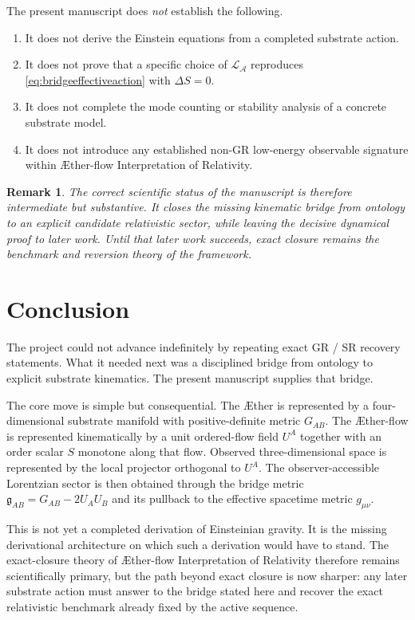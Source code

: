 \documentclass[11pt]{article}
\newcommand{\Aether}{\AE{}ther}
\newcommand{\Aflow}{\AE{}ther-flow}
\newcommand{\TheoryName}{\Aflow{} Interpretation of Relativity}
\newcommand{\Sub}{\mathcal{A}}
\newcommand{\BridgeMetric}{\mathfrak{g}}
\newtheorem{remark}{Remark}
\begin{document}
The present manuscript does \emph{not} establish the following.
\begin{enumerate}
    \item It does not derive the Einstein equations from a completed substrate action.
    \item It does not prove that a specific choice of \(\mathcal{L}_{\Sub}\) reproduces \eqref{eq:bridgeeffectiveaction} with \(\Delta S=0\).
    \item It does not complete the mode counting or stability analysis of a concrete substrate model.
    \item It does not introduce any established non-GR low-energy observable signature within \TheoryName{}.
\end{enumerate}

\begin{remark}
The correct scientific status of the manuscript is therefore intermediate but substantive. It closes the missing kinematic bridge from ontology to an explicit candidate relativistic sector, while leaving the decisive dynamical proof to later work. Until that later work succeeds, exact closure remains the benchmark and reversion theory of the framework.
\end{remark}

\section{Conclusion}

The project could not advance indefinitely by repeating exact GR / SR recovery statements. What it needed next was a disciplined bridge from ontology to explicit substrate kinematics. The present manuscript supplies that bridge.

The core move is simple but consequential. The \Aether{} is represented by a four-dimensional substrate manifold with positive-definite metric \(G_{AB}\). The \Aflow{} is represented kinematically by a unit ordered-flow field \(U^A\) together with an order scalar \(S\) monotone along that flow. Observed three-dimensional space is represented by the local projector orthogonal to \(U^A\). The observer-accessible Lorentzian sector is then obtained through the bridge metric \(\BridgeMetric_{AB}=G_{AB}-2U_AU_B\) and its pullback to the effective spacetime metric \(g_{\mu\nu}\).

This is not yet a completed derivation of Einsteinian gravity. It is the missing derivational architecture on which such a derivation would have to stand. The exact-closure theory of \TheoryName{} therefore remains scientifically primary, but the path beyond exact closure is now sharper: any later substrate action must answer to the bridge stated here and recover the exact relativistic benchmark already fixed by the active sequence.
\end{document}
